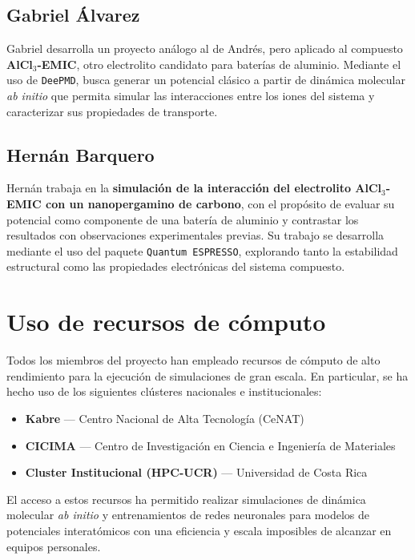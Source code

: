 \documentclass[10pt]{article}
\begin{document}
\subsection*{Gabriel Álvarez}

Gabriel desarrolla un proyecto análogo al de Andrés, pero aplicado al compuesto \textbf{AlCl$_3$-EMIC}, otro electrolito candidato para baterías de aluminio. 
Mediante el uso de \texttt{DeePMD}, busca generar un potencial clásico a partir de dinámica molecular \textit{ab initio} que permita simular las interacciones entre los iones del sistema y caracterizar sus propiedades de transporte.

\subsection*{Hernán Barquero}

Hernán trabaja en la \textbf{simulación de la interacción del electrolito AlCl$_3$-EMIC con un nanopergamino de carbono}, con el propósito de evaluar su potencial como componente de una batería de aluminio y contrastar los resultados con observaciones experimentales previas. 
Su trabajo se desarrolla mediante el uso del paquete \texttt{Quantum ESPRESSO}, explorando tanto la estabilidad estructural como las propiedades electrónicas del sistema compuesto.

\section*{Uso de recursos de cómputo}

Todos los miembros del proyecto han empleado recursos de cómputo de alto rendimiento para la ejecución de simulaciones de gran escala. En particular, se ha hecho uso de los siguientes clústeres nacionales e institucionales:

\begin{itemize}
    \item \textbf{Kabre} — Centro Nacional de Alta Tecnología (CeNAT)
    \item \textbf{CICIMA} — Centro de Investigación en Ciencia e Ingeniería de Materiales
    \item \textbf{Cluster Institucional (HPC-UCR)} — Universidad de Costa Rica
\end{itemize}

El acceso a estos recursos ha permitido realizar simulaciones de dinámica molecular \textit{ab initio} y entrenamientos de redes neuronales para modelos de potenciales interatómicos con una eficiencia y escala imposibles de alcanzar en equipos personales.
\end{document}
